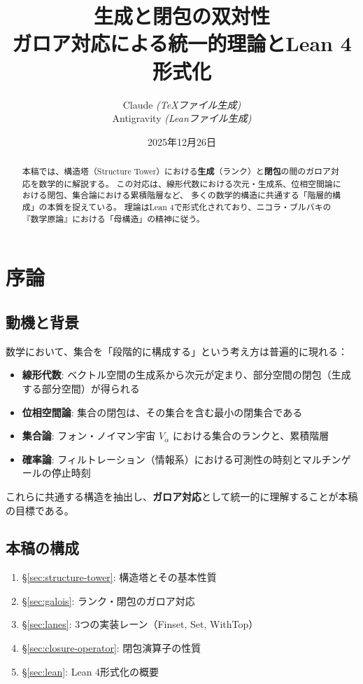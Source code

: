 \documentclass[a4paper,11pt]{ltjsarticle}
\title{%
  \textbf{生成と閉包の双対性}\\[0.5em]
  \large ガロア対応による統一的理論とLean 4形式化
}
\author{%
  Claude \textit{(TeXファイル生成)}\\
  Antigravity \textit{(Leanファイル生成)}
}
\date{2025年12月26日}
\theoremstyle{definition}
\begin{document}
\maketitle

\begin{abstract}
本稿では、構造塔（Structure Tower）における\textbf{生成}（ランク）と\textbf{閉包}の間のガロア対応を数学的に解説する。
この対応は、線形代数における次元・生成系、位相空間論における閉包、集合論における累積階層など、
多くの数学的構造に共通する「階層的構成」の本質を捉えている。
理論はLean 4で形式化されており、ニコラ・ブルバキの『数学原論』における「母構造」の精神に従う。
\end{abstract}

\tableofcontents

\section{序論}

\subsection{動機と背景}

数学において、集合を「段階的に構成する」という考え方は普遍的に現れる：

\begin{itemize}
  \item \textbf{線形代数}: ベクトル空間の生成系から次元が定まり、部分空間の閉包（生成する部分空間）が得られる
  \item \textbf{位相空間論}: 集合の閉包は、その集合を含む最小の閉集合である
  \item \textbf{集合論}: フォン・ノイマン宇宙 $V_\alpha$ における集合のランクと、累積階層
  \item \textbf{確率論}: フィルトレーション（情報系）における可測性の時刻とマルチンゲールの停止時刻
\end{itemize}

これらに共通する構造を抽出し、\textbf{ガロア対応}として統一的に理解することが本稿の目標である。

\subsection{本稿の構成}

\begin{enumerate}
  \item \S\ref{sec:structure-tower}: 構造塔とその基本性質
  \item \S\ref{sec:galois}: ランク・閉包のガロア対応
  \item \S\ref{sec:lanes}: 3つの実装レーン（Finset, Set, WithTop）
  \item \S\ref{sec:closure-operator}: 閉包演算子の性質
  \item \S\ref{sec:lean}: Lean 4形式化の概要
\end{enumerate}
\end{document}
